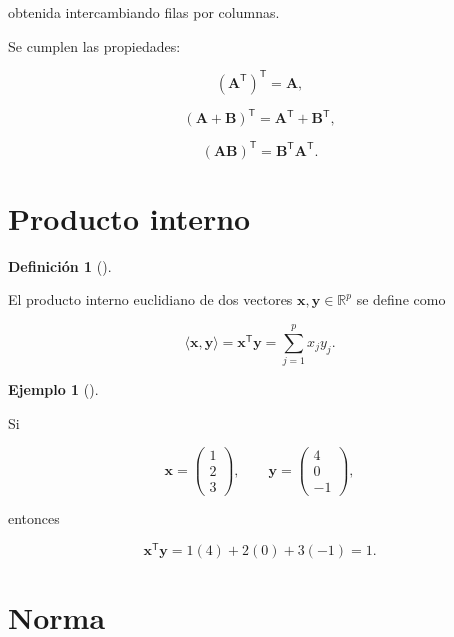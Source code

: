 \documentclass[
  spanish,
  10.5pt,
  letterpaper,
  DIV=11,
  numbers=noendperiod,
  oneside,
  open=any]{scrreprt}
\theoremstyle{definition}
\newtheorem{definition}{Definición}[chapter]
\theoremstyle{definition}
\newtheorem{example}{Ejemplo}[chapter]
\theoremstyle{plain}
\theoremstyle{remark}
\begin{document}
obtenida intercambiando filas por columnas.

Se cumplen las propiedades:

\[
(\mathbf{A}^{\mathsf T})^{\mathsf T}
=
\mathbf{A},
\]

\[
(\mathbf{A}+\mathbf{B})^{\mathsf T}
=
\mathbf{A}^{\mathsf T}
+
\mathbf{B}^{\mathsf T},
\]

\[
(\mathbf{A}\mathbf{B})^{\mathsf T}
=
\mathbf{B}^{\mathsf T}
\mathbf{A}^{\mathsf T}.
\]

\section*{Producto interno}\label{producto-interno}


\begin{definition}[]\protect\hypertarget{def-producto-interno}{}\label{def-producto-interno}

El producto interno euclidiano de dos vectores
\(\mathbf{x},\mathbf{y}\in\mathbb{R}^{p}\) se define como

\[
\langle\mathbf{x},\mathbf{y}\rangle
=
\mathbf{x}^{\mathsf T}\mathbf{y}
=
\sum_{j=1}^{p}x_jy_j.
\]

\end{definition}

\begin{example}[]\protect\hypertarget{exm-producto-interno}{}\label{exm-producto-interno}

Si

\[
\mathbf{x}
=
\begin{pmatrix}
1\\
2\\
3
\end{pmatrix},
\qquad
\mathbf{y}
=
\begin{pmatrix}
4\\
0\\
-1
\end{pmatrix},
\]

entonces

\[
\mathbf{x}^{\mathsf T}\mathbf{y}
=
1(4)+2(0)+3(-1)
=
1.
\]

\end{example}

\section*{Norma}\label{norma}
\end{document}
